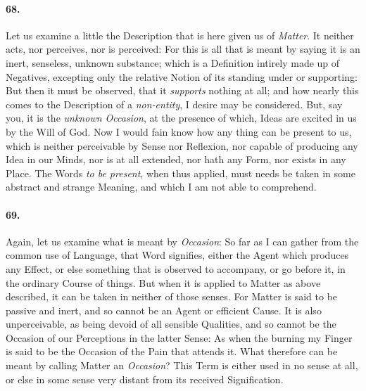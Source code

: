 \documentclass[]{article}
\newenvironment{sectionbody}{\begin{multicols}{2}}{\end{multicols}}
\begin{document}
\begin{sectionbody}
\paragraph{68.} Let us examine a little the Description that is here given us of
\emph{Matter}.  It neither acts, nor perceives, nor is
perceived: For this is all that is meant by saying it is an
inert, senseless, unknown substance; which is a Definition
intirely made up of Negatives, excepting only the relative Notion
of its standing under or supporting: But then it must be
observed, that it \emph{supports} nothing at all; and how nearly
this comes to the Description of a \emph{non-entity}, I desire may
be considered.  But, say you, it is the \emph{unknown
Occasion}, at the presence of which, Ideas are excited in us
by the Will of God.  Now I would fain know how any thing can be
present to us, which is neither perceivable by Sense nor
Reflexion, nor capable of producing any Idea in our Minds, nor is
at all extended, nor hath any Form, nor exists in any Place.  The
Words \emph{to be present}, when thus applied, must needs be
taken in some abstract and strange Meaning, and which I am not
able to comprehend.



\paragraph{69.} Again, let us examine what is meant by \emph{Occasion}: So far
as I can gather from the common use of Language, that Word
signifies, either the Agent which produces any Effect, or else
something that is observed to accompany, or go before it, in the
ordinary Course of things.  But when it is applied to Matter as
above described, it can be taken in neither of those senses.  For
Matter is said to be passive and inert, and so cannot be an Agent
or efficient Cause.  It is also unperceivable, as being devoid of
all sensible Qualities, and so cannot be the Occasion of our
Perceptions in the latter Sense: As when the burning my Finger is
said to be the Occasion of the Pain that attends it.  What
therefore can be meant by calling Matter an \emph{Occasion}?
This Term is either used in no sense at all, or else in some
sense very distant from its received Signification.




\end{sectionbody}
\end{document}
